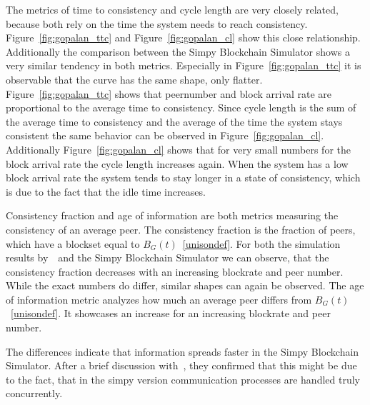 The metrics of time to consistency and cycle length are very closely related, because both rely on the time the system needs to reach consistency.
Figure~\ref{fig:gopalan_ttc} and Figure~\ref{fig:gopalan_cl} show this close relationship. Additionally the comparison between the Simpy Blockchain Simulator shows a very similar tendency in both metrics. Especially in Figure~\ref{fig:gopalan_ttc} it is observable that the curve has the same shape, only flatter. Figure~\ref{fig:gopalan_ttc} shows that peernumber and block arrival rate are proportional to the average time to consistency. Since cycle length is the sum of the average time to consistency and the average of the time the system stays consistent the same behavior can be observed in Figure~\ref{fig:gopalan_cl}. Additionally Figure~\ref{fig:gopalan_cl} shows that for very small numbers for the block arrival rate the cycle length increases again. When the system has a low block arrival rate the system tends to stay longer in a state of consistency, which is due to the fact that the idle time increases.

Consistency fraction and age of information are both metrics measuring the consistency of an average peer. The consistency fraction is the fraction of peers, which have a blockset equal to $B_G(t)$~\ref{unisondef}. For both the simulation results by~~and the Simpy Blockchain Simulator we can observe, that the consistency fraction decreases with an increasing blockrate and peer number. While the exact numbers do differ, similar shapes can again be observed.
The age of information metric analyzes how much an average peer differs from $B_G(t)$~\ref{unisondef}. It showcases an increase for an increasing blockrate and peer number.

The differences indicate that information spreads faster in the Simpy Blockchain Simulator. After a brief discussion with~, they confirmed that this might be due to the fact, that in the simpy version communication processes are handled truly concurrently.	

